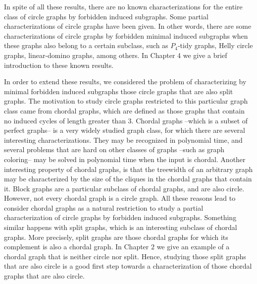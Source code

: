 \documentclass[12pt]{book}
\theoremstyle{plain}
\theoremstyle{remark}
\begin{document}
In spite of all these results, there are no known characterizations for the entire class of circle graphs by forbidden induced subgraphs. Some partial characterizations of circle graphs have been given. In other words, there are some characterizations of circle graphs by forbidden minimal induced subgraphs when these graphs also belong to a certain subclass, such as $P_4$-tidy graphs, Helly circle graphs, linear-domino graphs, among others. In Chapter 4 we give a brief introduction to these known results. 

In order to extend these results, we considered the problem of characterizing by minimal forbidden induced subgraphs those circle graphs that are also split graphs. 
The motivation to study circle graphs restricted to this particular graph class came from chordal graphs, which are defined as those graphs that contain no induced cycles of length greater than $3$. %
Chordal graphs --which is a subset of perfect graphs-- is a very widely studied graph class, for which there are several interesting characterizations. They may be recognized in polynomial time, and several problems that are hard on other classes of graphs --such as graph coloring-- may be solved in polynomial time when the input is chordal. Another interesting property of chordal graphs, is that the treewidth of an arbitrary graph may be characterized by the size of the cliques in the chordal graphs that contain it. 
Block graphs are a particular subclass of chordal graphs, and are also circle. However, not every chordal graph is a circle graph. All these reasons lead to consider chordal graphs as a natural restriction to study a partial characterization of circle graphs by forbidden induced subgraphs. Something similar happens with split graphs, which is an interesting subclass of chordal graphs. More precisely, split graphs are those chordal graphs for which its complement is also a chordal graph. In Chapter $2$ we give an example of a chordal graph that is neither circle nor split. Hence, studying those split graphs that are also circle is a good first step towards a characterization of those chordal graphs that are also circle. 
\end{document}

